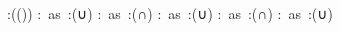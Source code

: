 \begin{multicols}{2}
\begin{mktsEnNotes}{\mktsEnStyleMarkNotes{}\mktsEnMarkAfter{}}
\end{mktsEnNotes}



\begingroup\mktsObeyAllLines{}
\cjkgGlue{}:(\cjkgGlue{}\cjkgGlue{}(\cjkgGlue{}\cjkgGlue{})\cjkgGlue{})
\cjkgGlue{}:\cjkgGlue{} as \cjkgGlue{}:({\mktsRsgFb{}∪}\cjkgGlue{})\cjkgGlue{} 
\cjkgGlue{}:\cjkgGlue{} as \cjkgGlue{}:({\mktsRsgFb{}∩}\cjkgGlue{})\cjkgGlue{} 
\cjkgGlue{}:\cjkgGlue{}\cjkgGlue{} as \cjkgGlue{}:({\mktsRsgFb{}∪}\cjkgGlue{})\cjkgGlue{} 
\cjkgGlue{}:\cjkgGlue{}\cjkgGlue{} as \cjkgGlue{}:({\mktsRsgFb{}∩}\cjkgGlue{})\cjkgGlue{} 
\cjkgGlue{}:\cjkgGlue{}\cjkgGlue{} as \cjkgGlue{}:({\mktsRsgFb{}∪}\cjkgGlue{})\cjkgGlue{} 
\endgroup{}

\end{multicols}





